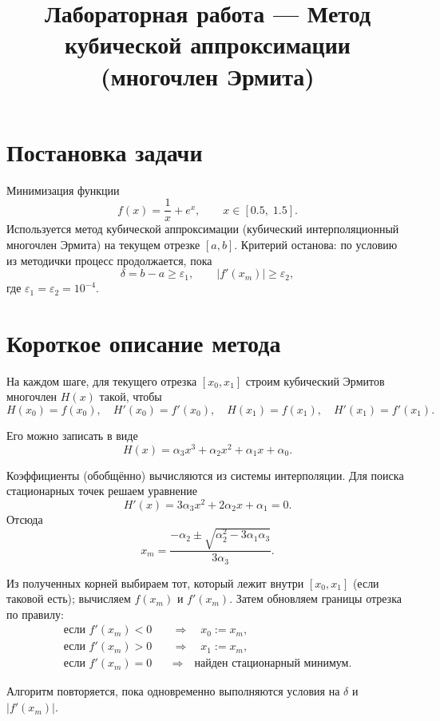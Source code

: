 \documentclass[a4paper,12pt]{article}
\title{Лабораторная работа — Метод кубической аппроксимации (многочлен Эрмита)}
\date{}
\begin{document}
\maketitle

\section*{Постановка задачи}
Минимизация функции
\[ f(x)=\frac{1}{x}+e^{x}, \qquad x\in[0.5,\;1.5].\]
Используется метод кубической аппроксимации (кубический интерполяционный многочлен Эрмита) на текущем отрезке $[a,b]$. Критерий останова: по условию из методички процесс продолжается, пока
\[\delta = b-a \ge \varepsilon_1,\qquad |f'(x_m)| \ge \varepsilon_2,\]
где $\varepsilon_1=\varepsilon_2=10^{-4}$.

\section*{Короткое описание метода}
На каждом шаге, для текущего отрезка $[x_0,x_1]$ строим кубический Эрмитов многочлен $H(x)$ такой, чтобы
\[ H(x_0)=f(x_0),\quad H'(x_0)=f'(x_0),\quad H(x_1)=f(x_1),\quad H'(x_1)=f'(x_1). \]

Его можно записать в виде
\[ H(x)=\alpha_3 x^3 + \alpha_2 x^2 + \alpha_1 x + \alpha_0. \]

Коэффициенты (обобщённо) вычисляются из системы интерполяции. Для поиска стационарных точек решаем уравнение
\[ H'(x)=3\alpha_3 x^2 + 2\alpha_2 x + \alpha_1 = 0. \]
Отсюда
\begin{equation}\label{eq:xm}
x_m = \frac{-\alpha_2 \pm \sqrt{\alpha_2^2 - 3\alpha_1\alpha_3}}{3\alpha_3}.
\end{equation}

Из полученных корней выбираем тот, который лежит внутри $[x_0,x_1]$ (если таковой есть); вычисляем $f(x_m)$ и $f'(x_m)$. Затем обновляем границы отрезка по правилу:
\begin{align*}
\text{если } f'(x_m)<0 &\quad\Rightarrow\quad x_0 := x_m,\\
\text{если } f'(x_m)>0 &\quad\Rightarrow\quad x_1 := x_m,\\
\text{если } f'(x_m)=0 &\quad\Rightarrow\quad \text{найден стационарный минимум.}
\end{align*}

Алгоритм повторяется, пока одновременно выполняются условия на $\delta$ и $|f'(x_m)|$.
\end{document}
